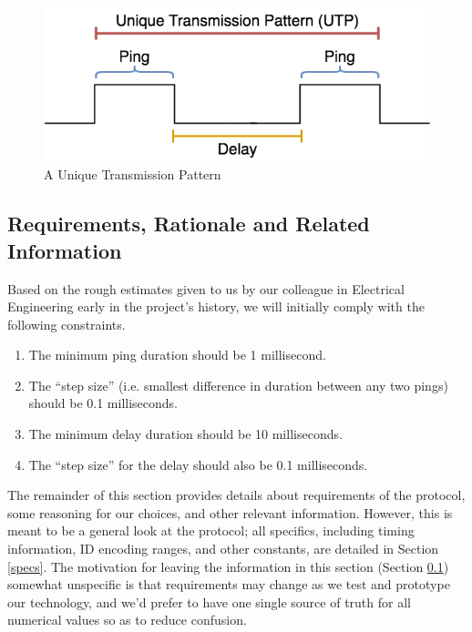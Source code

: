 \documentclass[12pt,hidelinks]{article}
\begin{document}
\begin{figure}[h]
\centering
\includegraphics[scale=0.5]{utp}

\caption{A Unique Transmission Pattern}\label{fig:utp}
\end{figure}

\subsection{Requirements, Rationale and Related Information} \label{rationale}

Based on the rough estimates given to us by our colleague in Electrical
Engineering early in the project's history, we will initially
comply with the following constraints.

\begin{enumerate} \itemsep -2pt
	\item The minimum ping duration should be 1 millisecond.
	\item The ``step size'' (i.e. smallest difference in duration between
		any two pings) should be 0.1 milliseconds.
	\item The minimum delay duration should be 10 milliseconds.
	\item The ``step size'' for the delay should also be 0.1 milliseconds.
\end{enumerate}

The remainder of this section provides details about requirements of the
protocol, some reasoning for our choices, and other relevant information.
However, this is meant to be a general look at the protocol;
all specifics, including timing information, ID encoding ranges, and other
constants, are detailed in Section \ref{specs}.
The motivation for leaving the information in this section
(Section \ref{rationale}) somewhat unspecific is that requirements may change
as we test and prototype our technology, and we'd prefer to have one single
source of truth for all numerical values so as to reduce confusion.
\end{document}
